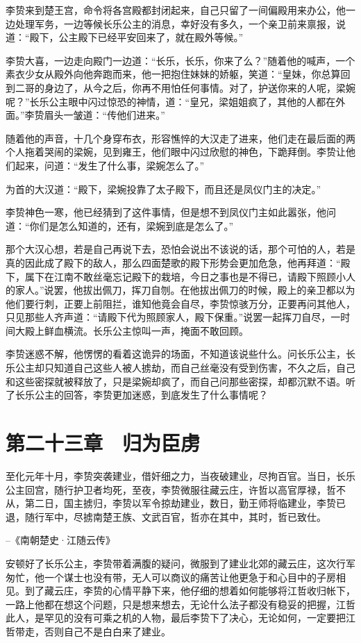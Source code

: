 李贽来到楚王宫，命令将各宫殿都封闭起来，自己只留了一间偏殿用来办公，他一边处理军务，一边等候长乐公主的消息，幸好没有多久，一个亲卫前来禀报，说道：“殿下，公主殿下已经平安回来了，就在殿外等候。”

李贽大喜，一边走向殿门一边道：“长乐，长乐，你来了么？”随着他的喊声，一个素衣少女从殿外向他奔跑而来，他一把抱住妹妹的娇躯，笑道：“皇妹，你总算回到二哥的身边了，从今之后，你再不用怕任何事情。对了，护送你来的人呢，梁婉呢？”长乐公主眼中闪过惊恐的神情，道：“皇兄，梁姐姐疯了，其他的人都在外面。”李贽眉头一皱道：“传他们进来。”

随着他的声音，十几个身穿布衣，形容憔悴的大汉走了进来，他们走在最后面的两个人拖着哭闹的梁婉，见到雍王，他们眼中闪过欣慰的神色，下跪拜倒。李贽让他们起来，问道：“发生了什么事，梁婉怎么了。”

为首的大汉道：“殿下，梁婉投靠了太子殿下，而且还是凤仪门主的决定。”

李贽神色一寒，他已经猜到了这件事情，但是想不到凤仪门主如此嚣张，他问道：“你们是怎么知道的，还有，梁婉到底是怎么了。”

那个大汉心想，若是自己再说下去，恐怕会说出不该说的话，那个可怕的人，若是真的因此成了殿下的敌人，那么四面楚歌的殿下形势会更加危急，他再拜道：“殿下，属下在江南不敢丝毫忘记殿下的栽培，今日之事也是不得已，请殿下照顾小人的家人。”说罢，他拔出佩刀，挥刀自刎。在他拔出佩刀的时候，殿上的亲卫都以为他们要行刺，正要上前阻拦，谁知他竟会自尽，李贽惊骇万分，正要再问其他人，只见那些人齐声道：“请殿下代为照顾家人，殿下保重。”说罢一起挥刀自尽，一时间大殿上鲜血横流。长乐公主惊叫一声，掩面不敢回顾。

李贽迷惑不解，他愣愣的看着这诡异的场面，不知道该说些什么。问长乐公主，长乐公主却只知道自己这些人被人掳劫，而自己丝毫没有受到伤害，不久之后，自己和这些密探就被释放了，只是梁婉却疯了，而自己问那些密探，却都沉默不语。听了长乐公主的回答，李贽更加迷惑，到底发生了什么事情呢？

\chapter{第二十三章　归为臣虏}

至化元年十月，李贽突袭建业，借奸细之力，当夜破建业，尽拘百官。当日，长乐公主回宫，随行护卫者均死，至夜，李贽微服往藏云庄，许哲以高官厚禄，哲不从，第二日，国主掳归，李贽以军令掠劫建业，数日，勤王师将临建业，李贽已退，随行军中，尽掳南楚王族、文武百官，哲亦在其中，其时，哲已致仕。

--《南朝楚史·江随云传》

安顿好了长乐公主，李贽带着满腹的疑问，微服到了建业北郊的藏云庄，这次行军匆忙，他一个谋士也没有带，无人可以商议的痛苦让他更急于和心目中的子房相见。到了藏云庄，李贽的心情平静下来，他仔细的想着如何能够将江哲收归帐下，一路上他都在想这个问题，只是想来想去，无论什么法子都没有稳妥的把握，江哲此人，是罕见的没有可乘之机的人物，最后李贽下了决心，无论如何，一定要把江哲带走，否则自己不是白白来了建业。

